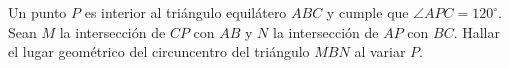 Un punto $P$ es interior al triángulo equilátero $ABC$ y cumple que $\angle APC = 120^{\circ}$. \newline 
Sean $M$ la intersección de $CP$ con $AB$ y $N$ la intersección de $AP$ con $BC$. Hallar el lugar geométrico del circuncentro del triángulo $MBN$ al variar $P$.
